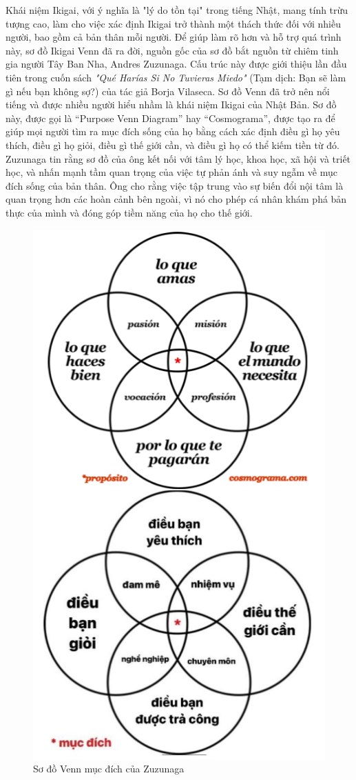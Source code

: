 Khái niệm Ikigai, với ý nghĩa là "lý do tồn tại" trong tiếng Nhật, mang tính trừu tượng cao, làm cho việc xác định Ikigai trở thành một thách thức đối với nhiều người, bao gồm cả bản thân mỗi người. Để giúp làm rõ hơn và hỗ trợ quá trình này, sơ đồ Ikigai Venn đã ra đời, nguồn gốc của sơ đồ bắt nguồn từ chiêm tinh gia người Tây Ban Nha, Andres Zuzunaga. Cấu trúc này được giới thiệu lần đầu tiên trong cuốn sách \textit{"Qué Harías Si No Tuvieras Miedo"} (Tạm dịch: Bạn sẽ làm gì nếu bạn không sợ?) của tác giả Borja Vilaseca. Sơ đồ Venn đã trở nên nổi tiếng và được nhiều người hiểu nhầm là khái niệm Ikigai của Nhật Bản. Sơ đồ này, được gọi là “Purpose Venn Diagram” hay “Cosmograma”, được tạo ra để giúp mọi người tìm ra mục đích sống của họ bằng cách xác định điều gì họ yêu thích, điều gì họ giỏi, điều gì thế giới cần, và điều gì họ có thể kiếm tiền từ đó. Zuzunaga tin rằng sơ đồ của ông kết nối với tâm lý học, khoa học, xã hội và triết học, và nhấn mạnh tầm quan trọng của việc tự phản ánh và suy ngẫm về mục đích sống của bản thân. Ông cho rằng việc tập trung vào sự biến đổi nội tâm là quan trọng hơn các hoàn cảnh bên ngoài, vì nó cho phép cá nhân khám phá bản thực của mình và đóng góp tiềm năng của họ cho thế giới.

\begin{figure}[H]
    \centering
    \includegraphics[width=0.5\linewidth]{images/zuzunaga.png}
    \vspace{0.6cm}
    \caption{Sơ đồ Venn mục đích của Zuzunaga}
\end{figure}

